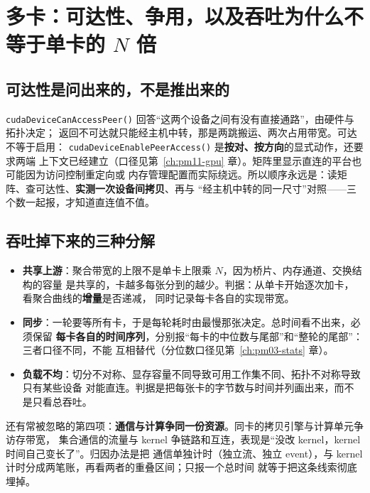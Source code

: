 \documentclass[12pt,a4paper,fontset=fandol]{ctexbook}
\newcommand{\Fn}[1]{\texttt{#1()}}
\newcommand{\Bk}{\discretionary{}{}{}}
\begin{document}
\section{多卡：可达性、争用，以及吞吐为什么不等于单卡的 $N$ 倍}
\label{sec:pm12-multigpu}

\subsection*{可达性是问出来的，不是推出来的}
\Fn{cuda{\Bk}Device{\Bk}CanAccessPeer} 回答``这两个设备之间有没有直接通路''，由硬件与拓扑决定；
返回不可达就只能经主机中转，那是两跳搬运、两次占用带宽。可达不等于启用：
\Fn{cuda{\Bk}Device{\Bk}Enable{\Bk}PeerAccess} 是\textbf{按对、按方向}的显式动作，还要求两端
上下文已经建立（口径见第~\ref{ch:pm11-gpu} 章）。矩阵里显示直连的平台也可能因为访问控制重定向或
内存管理配置而实际绕远。所以顺序永远是：读矩阵、查可达性、\textbf{实测一次设备间拷贝}、再与
``经主机中转的同一尺寸''对照——三个数一起报，才知道直连值不值。

\subsection*{吞吐掉下来的三种分解}
\begin{itemize}
\item \textbf{共享上游}：聚合带宽的上限不是单卡上限乘 $N$，因为桥片、内存通道、交换结构的容量
  是共享的，卡越多每张分到的越少。判据：从单卡开始逐次加卡，看聚合曲线的\textbf{增量}是否递减，
  同时记录每卡各自的实现带宽。
\item \textbf{同步}：一轮要等所有卡，于是每轮耗时由最慢那张决定。总时间看不出来，必须保留
  \textbf{每卡各自的时间序列}，分别报``每卡的中位数与尾部''和``整轮的尾部''：三者口径不同，不能
  互相替代（分位数口径见第~\ref{ch:pm03-stats} 章）。
\item \textbf{负载不均}：切分不对称、显存容量不同导致可用工作集不同、拓扑不对称导致只有某些设备
  对能直连。判据是把每张卡的字节数与时间并列画出来，而不是只看总吞吐。
\end{itemize}
还有常被忽略的第四项：\textbf{通信与计算争同一份资源}。同卡的拷贝引擎与计算单元争访存带宽，
集合通信的流量与 kernel 争链路和互连，表现是``没改 kernel，kernel 时间自己变长了''。归因办法是把
通信单独计时（独立流、独立 event），与 kernel 计时分成两笔账，再看两者的重叠区间；只报一个总时间
就等于把这条线索彻底埋掉。
\end{document}
